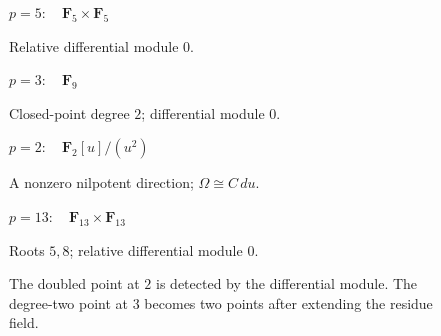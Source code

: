 \expandafter\def\csname derivativefigure@arithmetic\endcsname{%
\begin{figure}[H]
\centering
{}
\begin{minipage}[t]{.48\linewidth}\centering
  {\fontsize{10}{12}\selectfont \(p=5:\quad\mathbf F_5\times\mathbf F_5\)}\par\smallskip
  \par
  {\fontsize{9.5}{11.5}\selectfont Relative differential module \(0\).}
\end{minipage}\hfill
\begin{minipage}[t]{.48\linewidth}\centering
  {\fontsize{10}{12}\selectfont \(p=3:\quad\mathbf F_9\)}\par\smallskip
  \par
  {\fontsize{9.5}{11.5}\selectfont Closed-point degree \(2\); differential module \(0\).}
\end{minipage}
\par\medskip
\begin{minipage}[t]{.48\linewidth}\centering
  {\fontsize{10}{12}\selectfont \(p=2:\quad\mathbf F_2[u]/(u^2)\)}\par\smallskip
  \par
  {\fontsize{9.5}{11.5}\selectfont A nonzero nilpotent direction; \(\Omega\cong C\,du\).}
\end{minipage}\hfill
\begin{minipage}[t]{.48\linewidth}\centering
  {\fontsize{10}{12}\selectfont \(p=13:\quad\mathbf F_{13}\times\mathbf F_{13}\)}\par\smallskip
  \par
  {\fontsize{9.5}{11.5}\selectfont Roots \(5,8\); relative differential module \(0\).}
\end{minipage}
\caption{The doubled point at \(2\) is detected by the differential module. The degree-two point at \(3\) becomes two points after extending the residue field.}
\label{fig:arithmetic}
\end{figure}%
}

